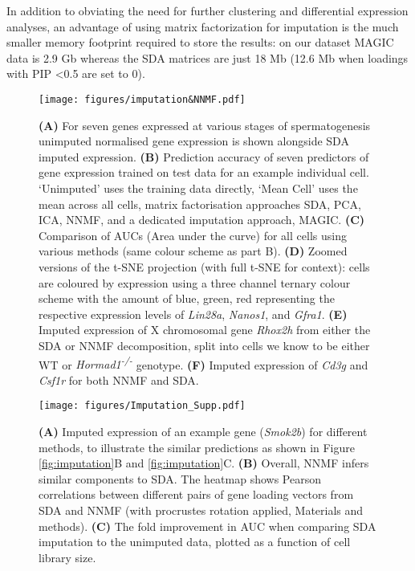 In addition to obviating the need for further clustering and differential expression analyses, an advantage of using matrix factorization for imputation is the much smaller memory footprint required to store the results: on our dataset MAGIC data is 2.9 Gb whereas the SDA matrices are just 18 Mb (12.6 Mb when loadings with PIP <0.5 are set to 0).


\begin{figure}[H]
	\centering
	\texttt{[image: figures/imputation\&NNMF.pdf]}
	\caption{
		\textbf{(A)} For seven genes expressed at various stages of spermatogenesis unimputed normalised gene expression is shown alongside SDA imputed expression.
		\textbf{(B)} Prediction accuracy of seven predictors of gene expression trained on test data for an example individual cell. ‘Unimputed’ uses the training data directly, ‘Mean Cell’ uses the mean across all cells, matrix factorisation approaches SDA, PCA, ICA, NNMF, and a dedicated imputation approach, MAGIC.
		\textbf{(C)} Comparison of AUCs (Area under the curve) for all cells using various methods (same colour scheme as part B).
		\textbf{(D)} Zoomed versions of the t-SNE projection (with full t-SNE for context): cells are coloured by expression using a three channel ternary colour scheme with the amount of blue, green, red representing the respective expression levels of \textit{Lin28a}, \textit{Nanos1}, and \textit{Gfra1}.
		\textbf{(E)} Imputed expression of X chromosomal gene \textit{Rhox2h} from either the SDA or NNMF decomposition, split into cells we know to be either WT or \textit{Hormad1\textsuperscript{-/-}} genotype.
		\textbf{(F)} Imputed expression of \textit{Cd3g} and \textit{Csf1r} for both NNMF and SDA.}
	\label{fig:imputation_supp}
\end{figure}

\begin{figure}[H]
	\centering
	\texttt{[image: figures/Imputation\_Supp.pdf]}
	\caption{
		\textbf{(A)} Imputed expression of an example gene (\textit{Smok2b}) for different methods, to illustrate the similar predictions as shown in Figure \ref{fig:imputation}B and \ref{fig:imputation}C.
		\textbf{(B)} Overall, NNMF infers similar components to SDA. The heatmap shows Pearson correlations between different pairs of gene loading vectors from SDA and NNMF (with procrustes rotation applied, Materials and methods).
		\textbf{(C)} The fold improvement in AUC when comparing SDA imputation to the unimputed data, plotted as a function of cell library size.
	}
	\label{fig:imputation_supp}
\end{figure}




